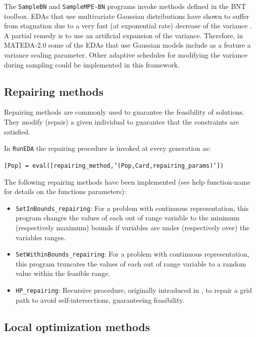 \documentclass[a4paper]{article}
\begin{document}
The \texttt{SampleBN} and \texttt{SampleMPE-BN} programs invoke
methods defined in the BNT toolbox. EDAs that  use multivariate
Gaussian distributions have shown to suffer from stagnation due to a
very fast (at exponential rate) decrease of the variance
\cite{Bosman_and_Grahl:2008}. A partial remedy is to use an
artificial expansion of the variance.  Therefore, in MATEDA-2.0 some
of the EDAs that use Gaussian models include as a feature a variance
scaling parameter. Other adaptive schedules
\cite{Bosman_et_al:2008a,Dong_and_Yao:2007,Grahl_et_al:2006,Posik:2008}
for modifying the variance during sampling could be implemented in
this framework.

\subsection{Repairing methods}

  Repairing methods are commonly used to guarantee the feasibility
  of solutions. They modify (repair) a given individual to guarantee
  that the constraints are satisfied.

In  \texttt{RunEDA} the repairing procedure is invoked at every
generation  as:


  \texttt{[Pop] =
  eval([repairing\_method,'(Pop,Card,repairing\_params)'])}

The following repairing  methods have been implemented (see help
function-name for details on the functions parameters):

\begin{itemize}
 \item \texttt{SetInBounds\_repairing}: For a problem with continuous representation, this program
 changes the values of each out of range variable  to the minimum (respectively maximum) bounds
 if variables are under (respectively over) the variables ranges.
\item \texttt{SetWithinBounds\_repairing}: For a problem with continuous representation, this program
 truncates the values of each out of range variable to a random
 value within the feasible range.
 \item \texttt{HP\_repairing}:   Recursive procedure, originally introduced in \cite{Cotta:2003},
 to repair a grid path to avoid self-intersections, guaranteeing feasibility.
\end{itemize}



\subsection{Local optimization methods}
\end{document}
